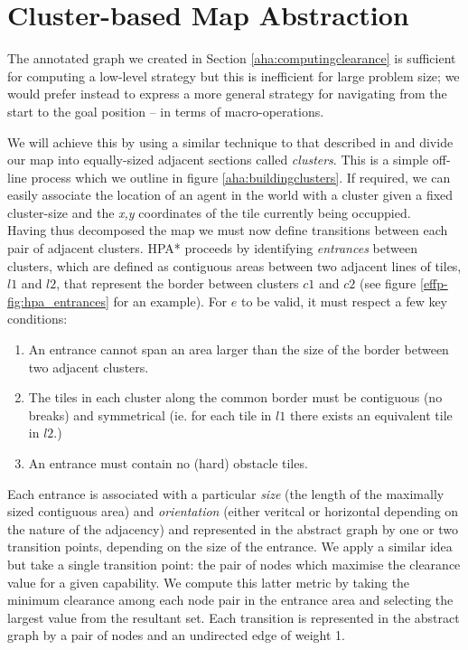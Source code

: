 \section{Cluster-based Map Abstraction}
\label{aha:mapabstraction}
The annotated graph we created in Section \ref{aha:computingclearance} is sufficient for computing a low-level strategy but this is inefficient for large problem size; we would prefer instead to express a more general strategy for navigating from the start to the goal position -- in terms of macro-operations.

We will achieve this by using a similar technique to that described in \cite{botea04} and divide our map into equally-sized adjacent sections called \emph{clusters}. This is a simple off-line process which we outline in figure \ref{aha:buildingclusters}. If required, we can easily associate the location of an agent in the world with a cluster given a fixed cluster-size and the \emph{x,y} coordinates of the tile currently being occuppied.\\ \newline
Having thus decomposed the map we must now define transitions between each pair of adjacent clusters. HPA* proceeds by identifying \emph{entrances} between clusters, which are defined as contiguous areas between two adjacent lines of tiles, $l1$ and $l2$, that represent the border between clusters $c1$ and $c2$ (see figure \ref{effp-fig:hpa_entrances} for an example). For $e$ to be valid, it must respect a few key conditions:
\begin{enumerate}
\item{An entrance cannot span an area larger than the size of the border between two adjacent clusters.}
\item{The tiles in each cluster along the common border must be contiguous (no breaks) and symmetrical (ie. for each tile in $l1$ there exists an equivalent tile in $l2$.)}
\item{An entrance must contain no (hard) obstacle tiles.}
\end{enumerate}
Each entrance is associated with a particular \emph{size} (the length of the maximally sized contiguous area) and \emph{orientation} (either veritcal or horizontal depending on the nature of the adjacency) and represented in the abstract graph by one or two transition points, depending on the size of the entrance. 
We apply a similar idea but take a single transition point: the pair of nodes which maximise the clearance value for a given capability. We compute this latter metric by taking the minimum clearance among each node pair in the entrance area and selecting the largest value from the resultant set. Each transition is represented in the abstract graph by a pair of nodes and an undirected edge of weight 1. 
